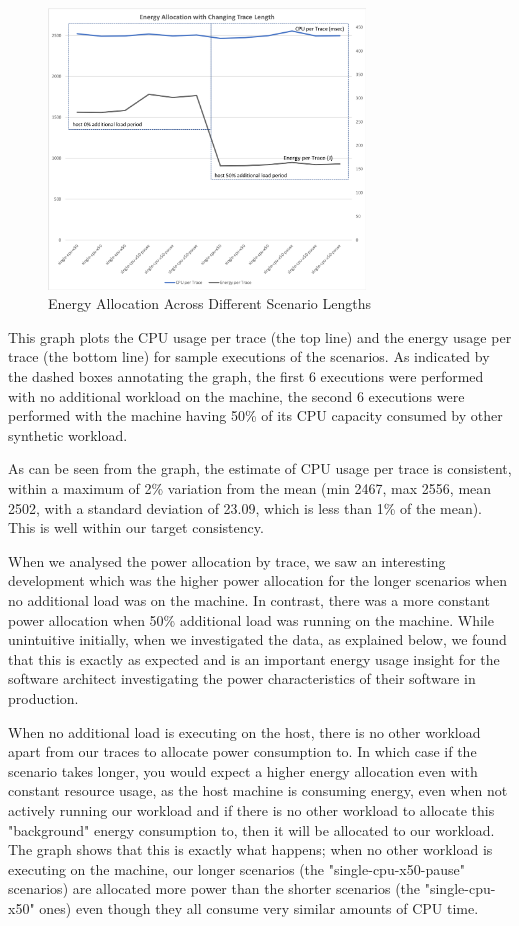 \begin{figure}
\centering
\includegraphics[width=0.75\textwidth,trim={2 2 2 2},clip]{Figures/validation-scenariolength}
\caption{Energy Allocation Across Different Scenario Lengths}
\label{figure:validation-scenariolength}
\end{figure}

This graph plots the CPU usage per trace (the top line) and the energy usage per trace (the bottom line) for sample executions of the scenarios.  As indicated by the dashed boxes annotating the graph, the first 6 executions were performed with no additional workload on the machine, the second 6 executions were performed with the machine having 50\% of its CPU capacity consumed by other synthetic workload.

As can be seen from the graph, the estimate of CPU usage per trace is consistent, within a maximum of 2\% variation from the mean (min 2467, max 2556, mean 2502, with a standard deviation of 23.09, which is less than 1\% of the mean).  This is well within our target consistency.

When we analysed the power allocation by trace, we saw an interesting development which was the higher power allocation for the longer scenarios when no additional load was on the machine. In contrast, there was a more constant power allocation when 50\% additional load was running on the machine.  While unintuitive initially, when we investigated the data, as explained below, we found that this is exactly as expected and is an important energy usage insight for the software architect investigating the power characteristics of their software in production.  

When no additional load is executing on the host, there is no other workload apart from our traces to allocate power consumption to.  In which case if the scenario takes longer, you would expect a higher energy allocation even with constant resource usage, as the host machine is consuming energy, even when not actively running our workload and if there is no other workload to allocate this "background" energy consumption to, then it will be allocated to our workload.  The graph shows that this is exactly what happens; when no other workload is executing on the machine, our longer scenarios (the "single-cpu-x50-pause" scenarios) are allocated more power than the shorter scenarios (the "single-cpu-x50" ones) even though they all consume very similar amounts of CPU time.

